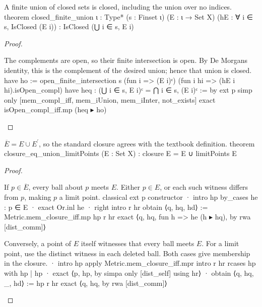 \begin{corollary} \label{an1:cor:finite-union-of-closed-sets-is-closed}
  \begin{lean}{A finite union of closed sets is closed, including the union over no indices.}
    theorem closed_finite_union {ι : Type*} (s : Finset ι)
        (E : ι → Set X) (hE : ∀ i ∈ s, IsClosed (E i)) :
        IsClosed (⋃ i ∈ s, E i)
  \end{lean}
\end{corollary}

\begin{proof}
  \begin{lean}{The complements are open, so their finite intersection is open. By De Morgan\textquotesingle s identity, this is the complement of the desired union; hence that union is closed.}
    have ho := open_finite_intersection s (fun i => (E i)ᶜ)
      (fun i hi => (hE i hi).isOpen_compl)
    have heq : (⋃ i ∈ s, E i)ᶜ = ⋂ i ∈ s, (E i)ᶜ := by
      ext p
      simp only [mem_compl_iff, mem_iUnion, mem_iInter, not_exists]
    exact isOpen_compl_iff.mp (heq ▸ ho)
  \end{lean}

\end{proof}

\begin{lemma} \label{an1:lem:closure-eq-union-limitPoints}
  \begin{lean}{$\overline E=E\cup E^{\prime}$, so the standard closure agrees with the textbook definition.}
    theorem closure_eq_union_limitPoints (E : Set X) :
        closure E = E ∪ limitPoints E
  \end{lean}
\end{lemma}

\begin{proof}
  \begin{lean}{If $p\in\overline E$, every ball about $p$ meets $E$. Either $p\in E$, or each such witness differs from $p$, making $p$ a limit point.}
    classical
    ext p
    constructor
    · intro hp
      by_cases he : p ∈ E
      · exact Or.inl he
      · right
        intro r hr
        obtain ⟨q, hq, hd⟩ := Metric.mem_closure_iff.mp hp r hr
        exact ⟨q, hq, fun h => he (h ▸ hq), by rwa [dist_comm]⟩
  \end{lean}

  \begin{lean}{Conversely, a point of $E$ itself witnesses that every ball meets $E$. For a limit point, use the distinct witness in each deleted ball. Both cases give membership in the closure.}
    · intro hp
      apply Metric.mem_closure_iff.mpr
      intro r hr
      rcases hp with hp | hp
      · exact ⟨p, hp, by simpa only [dist_self] using hr⟩
      · obtain ⟨q, hq, _, hd⟩ := hp r hr
        exact ⟨q, hq, by rwa [dist_comm]⟩
  \end{lean}

\end{proof}

